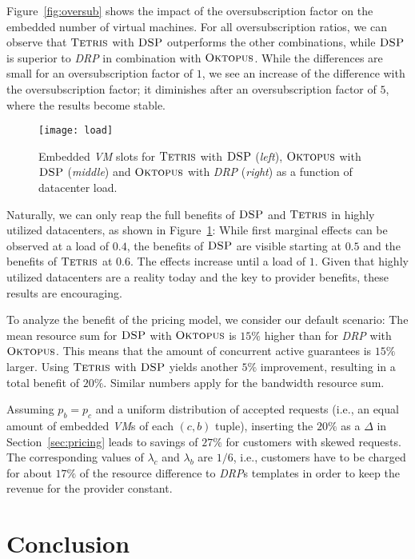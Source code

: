 \documentclass{sig-alternate-per}
\newcommand{\ALG}{\textsc{Tetris}}
\newcommand{\OKTO}{\textsc{Oktopus}}
\newcommand{\pricing}{\textsc{DSP}}
\begin{document}
Figure~\ref{fig:oversub} shows the impact of the oversubscription factor on the embedded number of virtual
machines. For all
oversubscription ratios, we can observe that $\ALG$ with $\pricing$ outperforms the other combinations, while $\pricing$
is
superior to \emph{DRP} in combination with $\OKTO$. While the differences are small for an oversubscription factor of
$1$, we see an increase of the difference  with the oversubscription factor; it diminishes after an oversubscription
factor of $5$, where the results become stable.

\begin{figure}[ht]
  \centering
\texttt{[image: load]}
      \caption{Embedded \emph{VM} slots for $\ALG$ with $\pricing$ (\emph{left}), $\OKTO$ with $\pricing$ (\emph{middle}) and $\OKTO$
with \emph{DRP} (\emph{right}) as a function of datacenter load.}
      \label{fig:load}
  \end{figure}

Naturally, we can only reap the full benefits of $\pricing$ and $\ALG$ in highly utilized datacenters,
as shown in Figure~\ref{fig:load}: While first marginal effects can be observed at a load of $0.4$, the benefits of $\pricing$ are
visible starting at $0.5$ and the benefits of $\ALG$ at $0.6$. The effects increase until a load of $1$.
Given that highly utilized datacenters are a reality today and the key to provider benefits, these results are encouraging.


To analyze the benefit of the pricing model, we consider our default scenario:
The mean resource sum for $\pricing$ with $\OKTO$ is $15\%$ higher than for \emph{DRP} with $\OKTO$. This means that the
amount of concurrent active guarantees is $15\%$ larger. Using $\ALG$ with $\pricing$ yields another $5\%$ improvement,
resulting in a total benefit of $20\%$. Similar numbers apply for the bandwidth resource sum.

Assuming $p_b=p_c$ and a uniform distribution of accepted requests (i.e., an equal amount of embedded \emph{VM}s
of each $(c,b)$ tuple), inserting the $20\%$ as a $\Delta$ in
Section~\ref{sec:pricing} leads to savings of $27\%$ for customers with skewed requests. The corresponding values of
$\lambda_c$ and $\lambda_b$ are $1/6$, i.e., customers have to be charged for about $17\%$ of the resource
difference to \emph{DRP}s templates in order to keep the revenue for the provider constant.

\section{Conclusion}\label{sec:conclusion}
\end{document}

